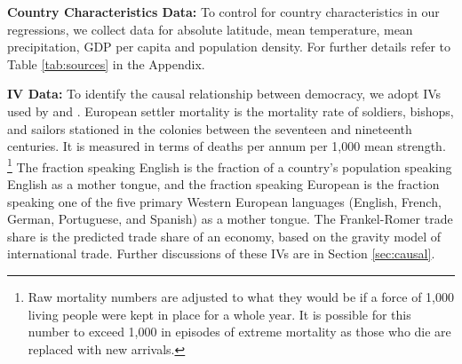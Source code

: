 \textbf{Country Characteristics Data:} To control for country characteristics in our regressions, we collect data for absolute latitude, mean temperature, mean precipitation, GDP per capita and population density. For further details refer to Table \ref{tab:sources} in the Appendix. 

\textbf{IV Data:} To identify the causal relationship between democracy, we adopt IVs used by \citet{ajr} and \citet{hj}. European settler mortality is the mortality rate of soldiers, bishops, and sailors stationed in the colonies between the seventeen and nineteenth centuries. It is measured in terms of deaths per annum per 1,000 mean strength. \footnote{Raw mortality numbers are adjusted to what they would be if a force of 1,000 living people were kept in place for a whole year. It is possible for this number to exceed 1,000 in episodes of extreme mortality as those who die are replaced with new arrivals.} The fraction speaking English is the fraction of a country's population speaking English as a mother tongue, and the fraction speaking European is the fraction speaking one of the five primary Western European languages (English, French, German, Portuguese, and Spanish) as a mother tongue. The Frankel-Romer trade share is the predicted trade share of an economy, based on the gravity model of international trade. Further discussions of these IVs are in Section \ref{sec:causal}.

